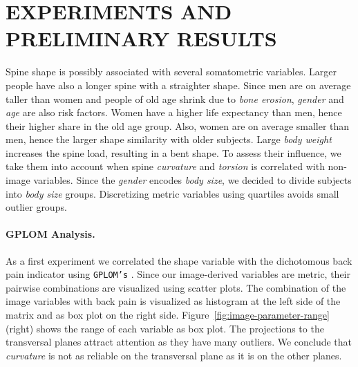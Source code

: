 \documentclass[a4paper,twoside]{style/article}
\begin{document}
\section{\uppercase{Experiments and Preliminary Results}}
\label{sec:Experiments}
\noindent Spine shape is possibly associated with several somatometric variables.
Larger people have also a longer spine with a straighter shape.
Since men are on average taller than women and people of old age shrink due to \emph{bone erosion}, \emph{gender} and \emph{age} are also risk factors.
Women have a higher life expectancy than men, hence their higher share in the old age group.
Also, women are on average smaller than men, hence the larger shape similarity with older subjects.
Large \emph{body weight} increases the spine load, resulting in a bent shape.
To assess their influence, we take them into account when spine \emph{curvature} and \emph{torsion} is correlated with non-image variables.
Since the \emph{gender} encodes \emph{body size}, we decided to divide subjects into \emph{body size} groups.
Discretizing metric variables using quartiles avoids small outlier groups.
\paragraph{GPLOM Analysis.}
As a first experiment we correlated the shape variable with the dichotomous back pain indicator using \texttt{GPLOM's} \cite{GPLOMS}.
Since our image-derived variables are metric, their pairwise combinations are visualized using scatter plots.
The combination of the image variables with back pain is visualized as histogram at the left side of the matrix and as box plot on the right side.
Figure~\ref{fig:image-parameter-range} (right) shows the range of each variable as box plot.
The projections to the transversal planes attract attention as they have many outliers.
We conclude that \emph{curvature} is not as reliable on the transversal plane as it is on the other planes.
\end{document}
